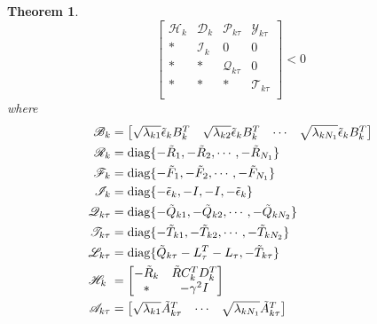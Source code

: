 \documentclass[conference]{IEEEtran}
\newtheorem{theorem}{Theorem}
\begin{document}
\begin{theorem}
	\begin{equation}\label{T3C3}
		\begin{bmatrix}
			\mathscr{H}_{k}&\mathscr{D}_{k}&\mathscr{P}_{k\tau }&\mathscr{Y}_{k\tau }\\
			*&\mathscr{I}_{k}&0&0\\
			*&*&\mathscr{Q}_{k\tau }&0\\
			*&*&*&\mathscr{T}_{k\tau }\\
		\end{bmatrix} <0
	\end{equation}
	where 
	\begin{equation}\notag
		\begin{split}
			\mathscr{B}_{k}&= \begin{bmatrix}
				\sqrt{\lambda_{k1}}\tilde{\epsilon}_{k}B^{T}_{k}&\sqrt{\lambda_{k2}}\tilde{\epsilon}_{k}B^{T}_{k}&\cdots&\sqrt{\lambda_{kN_{1}}}\tilde{\epsilon}_{k}B^{T}_{k}
			\end{bmatrix}\\
			\mathscr{R}_{k}&= \mathrm{diag}\{-\tilde{R}_{1}, -\tilde{R}_{2}, \cdots, -\tilde{R}_{N_{1}} \} \\
			\mathscr{F}_{k}&= \mathrm{diag}\{-\tilde{F}_{1}, -\tilde{F}_{2}, \cdots, -\tilde{F}_{N_{1}} \} \\	
			\mathscr{I}_{k} &= \mathrm{diag}\{-\tilde{\epsilon}_{k}, -I, -I, -\tilde{\epsilon}_{k} \}\\	
			\mathscr{Q}_{k\tau }&= \mathrm{diag}\{-\tilde{Q}_{k1}, -\tilde{Q}_{k2}, \cdots, -\tilde{Q}_{kN_{2}} \}\\
			\mathscr{T}_{k\tau }&= \mathrm{diag}\{-\tilde{T}_{k1}, -\tilde{T}_{k2}, \cdots, -\tilde{T}_{kN_{2}} \}\\
			\mathscr{L}_{k\tau }&= \mathrm{diag}\{\tilde{Q}_{k\tau }-L^{T}_{\tau }-L_{\tau },  -\tilde{T}_{k\tau } \}\\
			\mathscr{H}_{k}\ &= \begin{bmatrix}
				-\tilde{R}_{k} & \tilde{R}C^{T}_{k}D^{T}_{k}\\
				*& -\gamma^{2}I
			\end{bmatrix} \\
			\mathscr{A}_{k\tau } &=\begin{bmatrix}
				\sqrt{\lambda_{k1}} \tilde{A}^{T}_{k\tau }& \cdots&\sqrt{\lambda_{kN_{1}}} \tilde{A}^{T}_{k\tau }\\

\end{bmatrix}
\end{split}
\end{equation}
\end{theorem}
\end{document}
